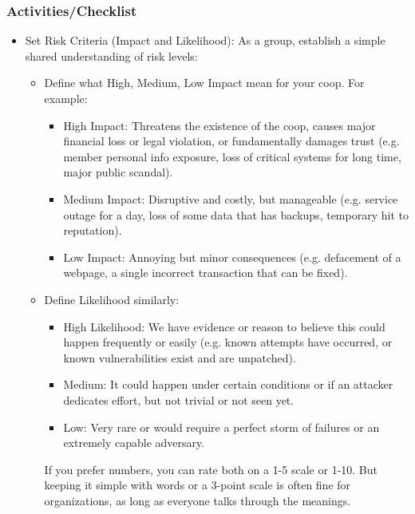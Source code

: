 \subsubsection{Activities/Checklist}

\begin{itemize}   
    \item Set Risk Criteria (Impact and Likelihood): As a group, establish a simple shared understanding of
risk levels:

    \begin{itemize}   
        \item Define what High, Medium, Low Impact mean for your coop. For example:
        \begin{itemize}   
            \item High Impact: Threatens the existence of the coop, causes major financial loss or
            legal violation, or fundamentally damages trust (e.g. member personal info exposure, loss of critical systems
            for long time, major public scandal).
            \item Medium Impact: Disruptive and costly, but manageable (e.g. service outage for a day,
            loss of some data that has backups, temporary hit to reputation).
            \item Low Impact: Annoying but minor consequences (e.g. defacement of a webpage, a single
            incorrect transaction that can be fixed).
        \end{itemize}
        \item Define Likelihood similarly:
        \begin{itemize}
            \item High Likelihood: We have evidence or reason to believe this could happen frequently
            or easily (e.g. known attempts have occurred, or known vulnerabilities exist and are unpatched).
            \item Medium: It could happen under certain conditions or if an attacker dedicates effort,
            but not trivial or not seen yet.
            \item Low: Very rare or would require a perfect storm of failures or an extremely capable
            adversary.
        \end{itemize}
        If you prefer numbers, you can rate both on a 1-5 scale or 1-10. But keeping it simple with
        words or a 3-point scale is often fine for organizations, as long as everyone talks through the meanings.
    \end{itemize}


\end{itemize}
